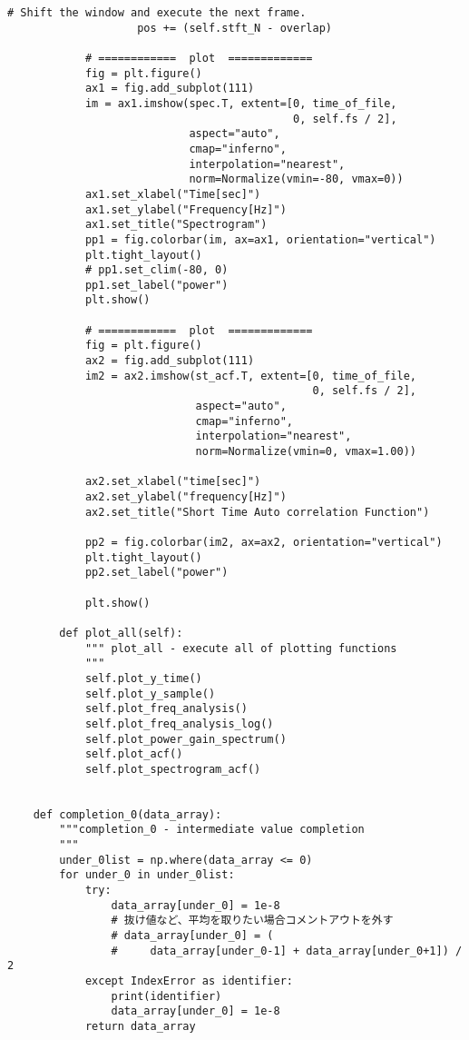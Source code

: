 \begin{lstlisting}[caption=plot\_tools.py,label=plot\_tools.py]
                    # Shift the window and execute the next frame.
                    pos += (self.stft_N - overlap)
    
            # ============  plot  =============
            fig = plt.figure()
            ax1 = fig.add_subplot(111)
            im = ax1.imshow(spec.T, extent=[0, time_of_file,
                                            0, self.fs / 2],
                            aspect="auto",
                            cmap="inferno",
                            interpolation="nearest",
                            norm=Normalize(vmin=-80, vmax=0))
            ax1.set_xlabel("Time[sec]")
            ax1.set_ylabel("Frequency[Hz]")
            ax1.set_title("Spectrogram")
            pp1 = fig.colorbar(im, ax=ax1, orientation="vertical")
            plt.tight_layout()
            # pp1.set_clim(-80, 0)
            pp1.set_label("power")
            plt.show()
    
            # ============  plot  =============
            fig = plt.figure()
            ax2 = fig.add_subplot(111)
            im2 = ax2.imshow(st_acf.T, extent=[0, time_of_file,
                                               0, self.fs / 2],
                             aspect="auto",
                             cmap="inferno",
                             interpolation="nearest",
                             norm=Normalize(vmin=0, vmax=1.00))
    
            ax2.set_xlabel("time[sec]")
            ax2.set_ylabel("frequency[Hz]")
            ax2.set_title("Short Time Auto correlation Function")
    
            pp2 = fig.colorbar(im2, ax=ax2, orientation="vertical")
            plt.tight_layout()
            pp2.set_label("power")
    
            plt.show()
    
        def plot_all(self):
            """ plot_all - execute all of plotting functions
            """
            self.plot_y_time()
            self.plot_y_sample()
            self.plot_freq_analysis()
            self.plot_freq_analysis_log()
            self.plot_power_gain_spectrum()
            self.plot_acf()
            self.plot_spectrogram_acf()
    
    
    def completion_0(data_array):
        """completion_0 - intermediate value completion
        """
        under_0list = np.where(data_array <= 0)
        for under_0 in under_0list:
            try:
                data_array[under_0] = 1e-8
                # 抜け値など、平均を取りたい場合コメントアウトを外す
                # data_array[under_0] = (
                #     data_array[under_0-1] + data_array[under_0+1]) / 2
            except IndexError as identifier:
                print(identifier)
                data_array[under_0] = 1e-8
            return data_array
    

\end{lstlisting}
